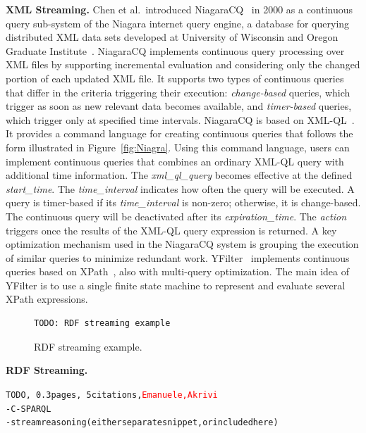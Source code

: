 \textbf{XML Streaming.}
Chen et al.\ introduced NiagaraCQ~\cite{chen_et_al_2000} in 2000 as a
continuous query sub-system of the Niagara internet query engine, a
data\-base for querying distributed XML data sets developed at
University of Wisconsin and Oregon Graduate
Institute~\cite{naughton2001niagara}. NiagaraCQ implements continuous
query processing over XML files by supporting incremental evaluation
and considering only the changed portion of each updated XML file. It
supports two types of continuous queries that differ in the criteria
triggering their execution: \emph{change-based} queries, which trigger
as soon as new relevant data becomes available, and \emph{timer-based}
queries, which trigger only at specified time intervals.  NiagaraCQ is
based on XML-QL~\cite{deutsch1999query}.  It provides a command
language for creating continuous queries that follows the form
illustrated in Figure~\ref{fig:Niagra}. Using this command language,
users can implement continuous queries that combines an ordinary
XML-QL query with additional time information.  The
\textsf{\small\textit{xml\_ql\_query}} becomes effective at the
defined \textsf{\small\textit{start\_time}}.  The
\textsf{\small\textit{time\_interval}} indicates how often the query
will be executed. A query is timer-based if its
\textsf{\small\textit{time\_interval}} is non-zero; otherwise, it is
change-based.  The continuous query will be deactivated after its
\textsf{\small\textit{expiration\_time}}. The
\textsf{\small\textit{action}} triggers once the results of the XML-QL
query expression is returned.  A key optimization mechanism used in
the NiagaraCQ system is grouping the execution of similar queries to
minimize redundant work.  YFilter~\cite{diao_et_al_2002} implements
continuous queries based on XPath~\cite{clark_derose_1999}, also with
multi-query optimization. The main idea of YFilter is to use a single
finite state machine to represent and evaluate several XPath
expressions.

\begin{figure}[!h]
\begin{lstlisting}
TODO: RDF streaming example
\end{lstlisting}
\vspace*{-4mm}
\caption{\label{fig:rdf}RDF streaming example.}
\end{figure}

\textbf{RDF Streaming.}
\begin{alltt}TODO\scriptsize, ~0.3 pages, ~5 citations, \textcolor{red}{Emanuele, Akrivi}
- C-SPARQL \cite{barbieri_et_al_2009}
- stream reasoning (either separate snippet, or included here)
\end{alltt}

